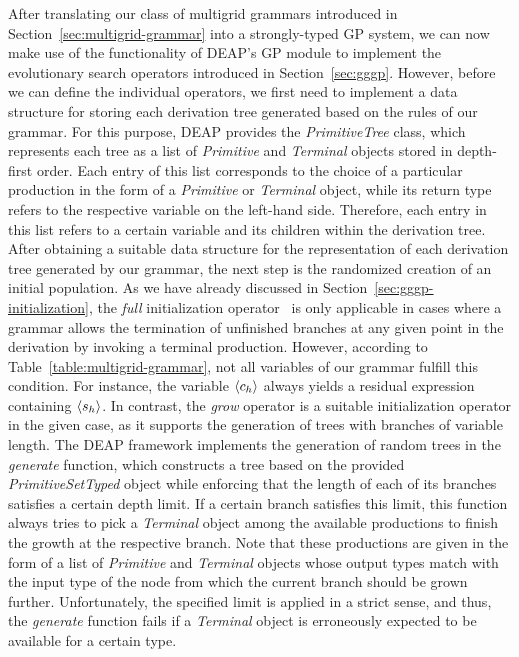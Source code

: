 After translating our class of multigrid grammars introduced in Section~\ref{sec:multigrid-grammar} into a strongly-typed GP system, we can now make use of the functionality of DEAP's GP module to implement the evolutionary search operators introduced in Section~\ref{sec:gggp}.
However, before we can define the individual operators, we first need to implement a data structure for storing each derivation tree generated based on the rules of our grammar.
For this purpose, DEAP provides the \emph{PrimitiveTree} class, which represents each tree as a list of \emph{Primitive} and \emph{Terminal} objects stored in depth-first order.
Each entry of this list corresponds to the choice of a particular production in the form of a \emph{Primitive} or \emph{Terminal} object, while its return type refers to the respective variable on the left-hand side.
Therefore, each entry in this list refers to a certain variable and its children within the derivation tree.
After obtaining a suitable data structure for the representation of each derivation tree generated by our grammar, the next step is the randomized creation of an initial population.
As we have already discussed in Section~\ref{sec:gggp-initialization}, the \emph{full} initialization operator~\cite{koza1994genetic,poli2008field} is only applicable in cases where a grammar allows the termination of unfinished branches at any given point in the derivation by invoking a terminal production.
However, according to Table~\ref{table:multigrid-grammar}, not all variables of our grammar fulfill this condition.
For instance, the variable $\langle c_h \rangle$ always yields a residual expression containing $\langle s_h \rangle$.
In contrast, the \emph{grow} operator is a suitable initialization operator in the given case, as it supports the generation of trees with branches of variable length. 
The DEAP framework implements the generation of random trees in the \emph{generate} function, which constructs a tree based on the provided \emph{PrimitiveSetTyped} object while enforcing that the length of each of its branches satisfies a certain depth limit.
If a certain branch satisfies this limit, this function always tries to pick a \emph{Terminal} object among the available productions to finish the growth at the respective branch. 
Note that these productions are given in the form of a list of \emph{Primitive} and \emph{Terminal} objects whose output types match with the input type of the node from which the current branch should be grown further.
Unfortunately, the specified limit is applied in a strict sense, and thus, the \emph{generate} function fails if a \emph{Terminal} object is erroneously expected to be available for a certain type.
